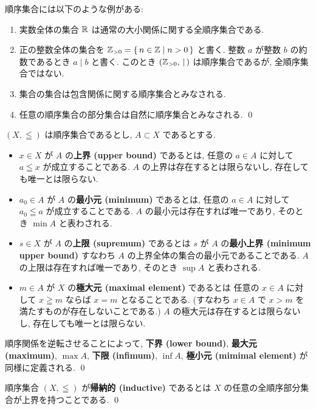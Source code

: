 \documentclass[12pt,twoside]{jarticle}
\begin{document}
\begin{example}[順序集合の例]
  順序集合には以下のような例がある:
  \begin{enumerate}
  \item 実数全体の集合 ${\mathbb R}$ は通常の大小関係に関する全順序集合である.
  \item 正の整数全体の集合を ${\mathbb Z}_{>0}=\{\,n\in{\mathbb Z}\mid n>0\,\}$ と書く.
    整数 $a$ が整数 $b$ の約数であるとき $a\mid b$ と書く.
    このとき $({\mathbb Z}_{>0},\,\mid\,)$ は順序集合であるが, 全順序集合ではない.
  \item 集合の集合は包含関係に関する順序集合とみなされる.
  \item 任意の順序集合の部分集合は自然に順序集合とみなされる.
    \qed
  \end{enumerate}
\end{example}

\begin{definition}
  $(X,\leqq)$ は順序集合であるとし, $A\subset X$ であるとする.
  \begin{itemize}
  \item  $x\in X$ が $A$ の{\bf 上界 (upper bound)} であるとは, 
    任意の $a\in A$ に対して $a\leqq x$ が成立することである.
    $A$ の上界は存在するとは限らないし, 存在しても唯一とは限らない.
  \item $a_0\in A$ が $A$ の{\bf 最小元 (minimum)} であるとは,
    任意の $a\in A$ に対して $a_0\leqq a$ が成立することである.
    $A$ の最小元は存在すれば唯一であり, そのとき $\min A$ と表わされる.
  \item $s\in X$ が $A$ の{\bf 上限 (supremum)} であるとは
    $s$ が $A$ の{\bf 最小上界 (minimum upper bound)} 
    すなわち $A$ の上界全体の集合の最小元であることである.
    $A$ の上限は存在すれば唯一であり, そのとき $\sup A$ と表わされる.
  \item $m\in A$ が $X$ の{\bf 極大元 (maximal element)} であるとは
    任意の $x\in A$ に対して $x\geqq m$ ならば $x=m$ となることである.
    (すなわち $x\in A$ で $x>m$ を満たすものが存在しないことである.)
    $A$ の極大元は存在するとは限らないし, 存在しても唯一とは限らない.
  \end{itemize}
  順序関係を逆転させることによって, 
  {\bf 下界 (lower bound)}, {\bf 最大元 (maximum)}, $\max A$, 
  {\bf 下限 (infimum)}, $\inf A$, {\bf 極小元 (mimimal element)} 
  が同様に定義される.
  \qed
\end{definition}

\begin{definition}[帰納的順序集合]
  順序集合 $(X,\leqq)$ が{\bf 帰納的 (inductive)} であるとは %
  $X$ の任意の全順序部分集合が上界を持つことである.
  \qed
\end{definition}
\end{document}
